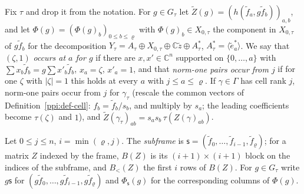 \documentclass[10pt]{amsart}
\theoremstyle{definition}
\theoremstyle{remark}
\newcommand{\C}{\mathbb C}
\begin{document}
Fix $\tau$ and drop it from the notation. For $g\in G_\tau$ let $\tilde Z(g)=(h(\tilde f_a,g\tilde
f_b))_{a,b}$, and let $\Phi(g)=(\Phi(g)_b)_{0\le b\le\varrho}$ with $\Phi(g)_b\in X_{0,\tau}$ the
component in $X_{0,\tau}$ of $g\tilde f_b$ for the decomposition $Y_\tau=A_\tau\oplus X_{0,\tau}\oplus
\C\tilde z\oplus A^*_\tau$, $A^*_\tau=\langle\tilde e^*_a\rangle$. We say that $(\zeta,1)$ \emph{occurs at
$a$ for $g$} if there are $x,x'\in\C^n$ supported on $\{0,\dots,a\}$ with $\sum x_b\tilde f_b=g\sum
x'_b\tilde f_b$, $x_a=\zeta$, $x'_a=1$, and that \emph{norm-one pairs occur from $j$} if for one $\zeta$
with $|\zeta|=1$ this holds at every $a$ with $j\le a\le\varrho$. If $\gamma\in\Gamma$ has cell rank
$j$, norm-one pairs occur from $j$ for $\gamma_\tau$ (rescale the common vectors of
Definition~\ref{ppi:def-cell}: $f_b=\tilde f_b/s_b$, and multiply by $s_a$; the leading coefficients
become $\tau(\zeta)$ and $1$), and $\tilde Z(\gamma_\tau)_{ab}=s_as_b\,\tau(Z(\gamma)_{ab})$.

Let $0\le j\le n$, $i=\min(\varrho,j)$. The \emph{subframe} is $\mathsf s=(\tilde f_0,\dots,\tilde
f_{i-1},\tilde f_\varrho)$; for a matrix $Z$ indexed by the frame, $B(Z)$ is its $(i+1)\times(i+1)$
block on the indices of the subframe, and $B_<(Z)$ the first $i$ rows of $B(Z)$. For $g\in G_\tau$
write $g\mathsf s$ for $(g\tilde f_0,\dots,g\tilde f_{i-1},g\tilde f_\varrho)$ and $\Phi_{\mathsf s}(g)$ for
the corresponding columns of $\Phi(g)$.
\end{document}
